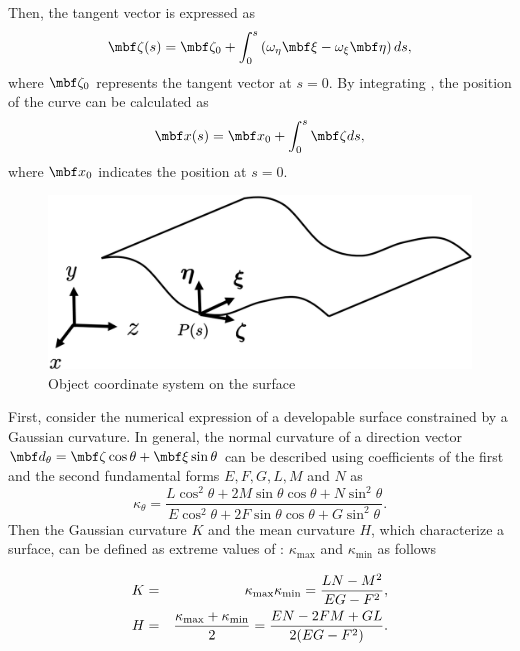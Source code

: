 \documentclass[E]{scitrans}
\begin{document}
Then, the tangent vector is expressed as 
\begin{equation}
\zetavec(s) = \zetavec_0 + \int_{0}^{s} \left( \omega_{\eta} \xivec - \omega_{\xi} \etavec \right) ds,
\label{eq:zetav_eq}
\end{equation}
where $\zetavec_0$ represents the tangent vector at $s=0$. By integrating , the position of the curve can be calculated as
\begin{equation}
\mbold{x}(s) = \mbold{x}_0 + \int_0^s \zetavec ds, 
\end{equation}
where $\mbold{x}_0$ indicates the position at $s=0$. 

\begin{figure}[thpb]
	\centering
	\includegraphics[width = 0.8\columnwidth]{./figure/Object_Coordinates.eps}
	\caption{Object coordinate system on the surface}
	\label{fig:obj_coord}
\end{figure}

First, consider the numerical expression of a developable surface constrained by a Gaussian curvature. In general, the normal curvature of a direction vector $\mbold{d}_{\theta} = \zetavec \cos \theta + \xivec \sin \theta $ can be described using coefficients of the first and the second fundamental forms $E, F, G, L, M$ and $N$ as
\begin{equation}\label{eq:def_kappa_theta}
\kappa_{\theta} = \frac{L \cos^2 \theta + 2M \sin \theta \cos \theta + N \sin^2 \theta}{E \cos^2 \theta + 2F \sin \theta \cos \theta + G \sin^2 \theta}.
\end{equation}
Then the Gaussian curvature $K$ and the mean curvature $H$, which characterize a surface, can be defined as extreme values of : $ \kappa_{\max} $ and $ \kappa_{\min} $ as follows\cite{cX4}

\begin{eqnarray}
K &=& \kappa_{\max}  \kappa_{\min}  = {\displaystyle{\frac{LN-M^2}{EG-F^2}}}, \nonumber \\ 
H &=& {\displaystyle{\frac{\kappa_{\max} + \kappa_{\min}}{2}}} = \frac{EN-2FM+GL}{2(EG-F^2)}. 
\end{eqnarray}
\end{document}
